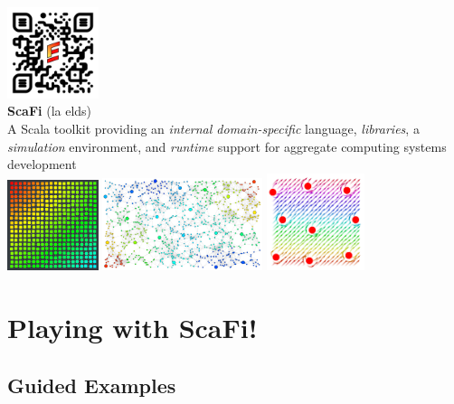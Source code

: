 \documentclass[presentation, 8pt]{beamer}\mode<presentation>{\usetheme{AMSBolognaFC}}
\begin{document}
\begin{frame}[c, plain]
\begin{center}
	\includegraphics[width=0.2\textwidth]{img/qr-code-scafi.png}\\
	{\Huge \textbf{ScaFi} (la elds)}\\
	{\large A Scala toolkit providing an \emph{internal domain-specific} language, \emph{libraries}, a \emph{simulation} environment, and \emph{runtime} support for  aggregate computing systems development} \\[0.3cm]
	\includegraphics[width=0.2\textwidth]{img/gradient-scafi.png}
	\includegraphics[width=0.35\textwidth]{img/scr-result.png}
	\includegraphics[width=0.215\textwidth]{img/obstacle-avoidance.png}
\end{center}
\end{frame}

\section{Playing with ScaFi!}%
\subsection{Guided Examples}
\end{document}
